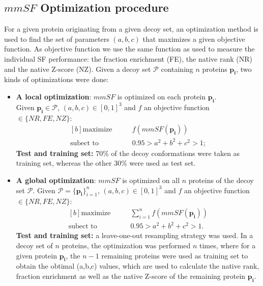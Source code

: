 \documentclass[a4paper,20pt,notitlepage,openbib]{article}
\begin{document}
\subsection{$mmSF$ Optimization procedure}
For a given protein originating from a given decoy set, an optimization method is used to find the set of parameters $(a,b,c)$ that maximizes a given objective function. As objective function we use the same function as used to measure the individual SF performance:  the fraction enrichment (FE), the native rank (NR) and the native Z-score (NZ).
Given a decoy set $\mathcal{P}$ containing $n$ proteins $\mathbf{p_{i}}$, two kinds of optimizations were done:
\begin{itemize}
\item \textbf{A local optimization}: $mmSF$ is optimized on each protein $\mathbf{p_{i}}$.\\
Given $\mathbf{p_{i}} \in \mathcal{P}$, $(a,b,c) \in [0,1]^{3}$ and $f$ an objective function $\in \{NR, FE, NZ\}$:
\begin{equation*}
\begin{aligned}[b]
\text{maximize}  &\qquad f(mmSF(\mathbf{p_{i}})) \\
\text{subect to} &\qquad 0.95 > a^{2}+b^{2}+c^{2} > 1 ;
\end{aligned}
\end{equation*}
\textbf{Test and training set:} 70\% of the decoy conformations were taken as training set, whereas the other 30\% were used as test set.
\item \textbf{A global optimization}: $mmSF$ is optimized on all $n$ proteins of the decoy set $\mathcal{P}$.
Given $\mathcal{P}=\{\mathbf{p_{i}}\}_{i=1}^{n}$, $(a,b,c) \in [0,1]^{3}$  and $f$ an objective function $\in \{NR, FE, NZ\}$:
\begin{equation*}
\begin{aligned}[b]
\text{maximize}  &\qquad \sum_{i=1}^{n}{f(mmSF(\mathbf{p_{i}}))} \\
\text{subect to} &\qquad 0.95 > a^{2}+b^{2}+c^{2} > 1 .
\end{aligned}
\end{equation*}
\textbf{Test and training set:} a leave-one-out resampling strategy was used. In a decoy set of $n$ proteins, the optimization was performed $n$ times, where for a given protein  $\mathbf{p_{i}}$, the $n-1$ remaining proteins were used as training set to obtain the obtimal (a,b,c) values, which are used to calculate the native rank, fraction enrichment as well as the native Z-score of the remaining protein $\mathbf{p_{i}}$.
\end{itemize}
\end{document}
